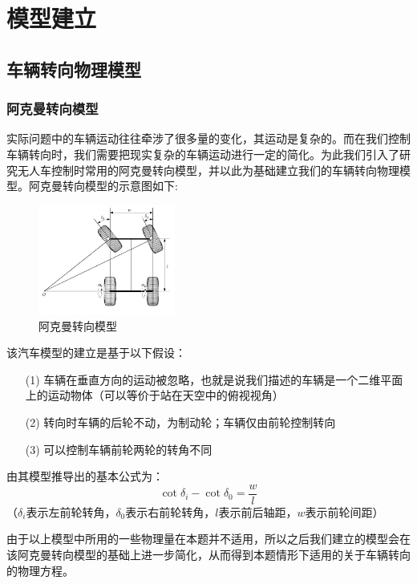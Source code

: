 \documentclass{article}
\begin{document}
	\section{模型建立}
	\subsection{车辆转向物理模型}
	\subsubsection{阿克曼转向模型}
	实际问题中的车辆运动往往牵涉了很多量的变化，其运动是复杂的。而在我们控制车辆转向时，我们需要把现实复杂的车辆运动进行一定的简化。为此我们引入了研究无人车控制时常用的阿克曼转向模型，并以此为基础建立我们的车辆转向物理模型。阿克曼转向模型的示意图如下:
	\begin{figure}[!h]
		\centering 
			\includegraphics[width=0.4\textwidth]{阿克曼转向模型.png}	
			\caption{阿克曼转向模型}
	\end{figure}
    
    该汽车模型的建立是基于以下假设：
    \begin{itemize}
    	\item[(1)] 车辆在垂直方向的运动被忽略，也就是说我们描述的车辆是一个二维平面上的运动物体（可以等价于站在天空中的俯视视角）
    	\item[(2)] 转向时车辆的后轮不动，为制动轮；车辆仅由前轮控制转向
    	\item[(3)] 可以控制车辆前轮两轮的转角不同
    \end{itemize}

    由其模型推导出的基本公式为：
    \begin{equation}
    	\cot \delta_{i}-\cot \delta_{0} =\frac{w}{l}
    \end{equation}
    （$\delta_{i}$表示左前轮转角，$\delta_{0}$表示右前轮转角，$l$表示前后轴距，$w$表示前轮间距）
    
    由于以上模型中所用的一些物理量在本题并不适用，所以之后我们建立的模型会在该阿克曼转向模型的基础上进一步简化，从而得到本题情形下适用的关于车辆转向的物理方程。
    
\end{document}
